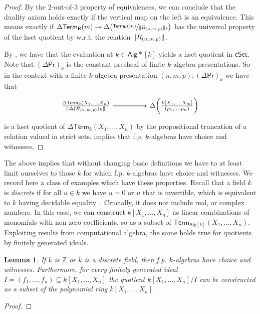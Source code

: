 \documentclass[10pt,a4paper]{article}
\newtheorem{lemma}[theorem]{Lemma}
\theoremstyle{definition}
\theoremstyle{remark}
\newcommand{\ints}{\mathbb{Z}}
\newcommand{\cSet}{\mathsf{cSet}}
\newcommand{\Alg}{\mathsf{Alg}}
\DeclarePairedDelimiter\paren{(}{)}
\newcommand\R{\mathsf{R}}
\renewcommand\Pr{\mathsf{Pr}}
\newcommand\Term{\mathsf{Term}}
\begin{document}
\begin{proof}
  By the \(2\)-out-of-\(3\) property of equivalences, we can conclude that the duality axiom holds exactly if the vertical map on the left is an equivalence.
  This means exactly if \(\Delta\Term_{\R}(m) \to \Delta\paren[\big]{\sfrac{\Term_{\R}(m)}{\trunc*{R_{(n,m,p)}}}}\) has the universal property of the hset quotient by w.r.t. the relation \(\trunc{R_{(n,m,p)}}\).

  By , we have that the evaluation at \(k \in \Alg*[k]\) yields a hset quotient in \(\cSet\). 
  Note that \((\Delta \Pr)_k\) is the constant presheaf of finite \(k\)-algebra presentations.
  So in the context with a finite \(k\)-algebra presentation \((n, m, p) \colon (\Delta \Pr)_k\) we have that 
  \[\begin{tikzcd}
    {\frac{\Delta \Term_k(X_1, \ldots, X_n)}{\trunc{\Delta (R_{(n,m,p)})_k}}} && {\Delta\paren[\bigg]{\frac{k[X_1, \ldots, X_m]}{(p_1, \ldots, p_n)}}}
    \arrow[from=1-1, to=1-3]
    \arrow[from=1-1, to=1-3]
  \end{tikzcd}\]
  is a hset quotient of \(\Delta \Term_k(X_1, \ldots, X_n)\) by the propositional truncation of a relation valued in strict sets.
   implies that f.p. \(k\)-algebras have choice and witnesses.
\end{proof}

The above implies that without changing basic definitions we have to at least limit ourselves to those \(k\) for which f.p. \(k\)-algebras have choice and witnesses.
We record here a class of examples which have these properties.
Recall that a field \(k\) is \emph{discrete} if for all \(u \in k\) we have \(u = 0\) or \(u\) that is invertible, which is equivalent to \(k\) having decidable equality~\cite{mines}.
Crucially, it does not include real, or complex numbers.
In this case, we can construct \(k[X_1, \ldots, X_n]\) as linear combinations of monomials with non-zero coefficients, so as a subset of \(\Term_{\Alg[k]}(X_1, \ldots, X_n)\).
Exploiting results from computational algebra, the same holds true for quotients by finitely generated ideals.

\begin{lemma}\label{prop:good-base-rings-exist}
  If \(k\) is \(\ints\) or \(k\) is a discrete field, then f.p. \(k\)-algebras have choice and witnesses.
  Furthermore, for every finitely generated ideal \(I = (f_1, \ldots, f_n) \subseteq k[X_1, \ldots, X_n]\) the quotient \(k[X_1,\ldots,X_n]/I\) can be constructed as a subset of the polynomial ring \(k[X_1, \ldots, X_n]\).
\end{lemma}
\begin{proof}

\end{proof}
\end{document}
